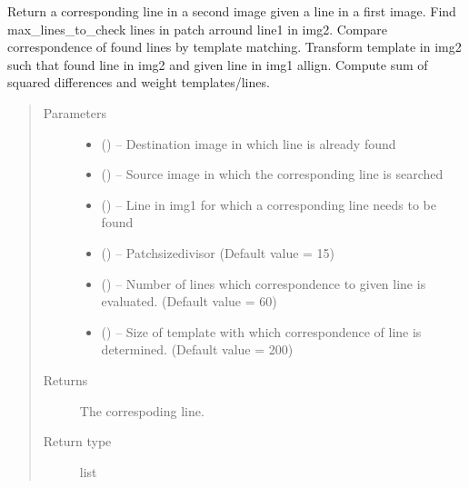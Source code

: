 \documentclass[letterpaper,10pt,english]{sphinxmanual}
\begin{document}
\begin{fulllineitems}
\label{\detokenize{image_lines:image_lines.get_corresponding_line}}
Return a corresponding line in a second image given a line in a first image.
Find max\_lines\_to\_check lines in patch arround line1 in img2. Compare
correspondence of found lines by template matching. Transform template in
img2 such that found line in img2 and given line in img1 allign. Compute
sum of squared differences and weight templates/lines.
\begin{quote}\begin{description}
\item[{Parameters}] \leavevmode\begin{itemize}
\item {} 
 () -- Destination image in which line is already found

\item {} 
 () -- Source image in which the corresponding line is searched

\item {} 
 () -- Line in img1 for which a corresponding line needs to be found

\item {} 
 () -- Patchsizedivisor (Default value = 15)

\item {} 
 () -- Number of lines which correspondence to given line is evaluated.
(Default value = 60)

\item {} 
 () -- Size of template with which correspondence of line is determined.
(Default value = 200)

\end{itemize}

\item[{Returns}] \leavevmode
The correspoding line.

\item[{Return type}] \leavevmode
list

\end{description}\end{quote}

\end{fulllineitems}
\end{document}
